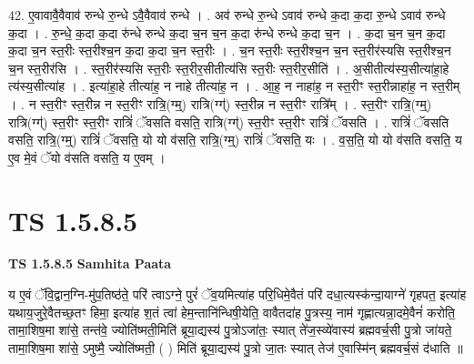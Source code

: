 \documentclass[17pt]{extarticle}
\begin{document}
42. ए॒वावावै॒वैवाव॑ रुन्धे रु॒न्धे ऽवै॒वैवाव॑ रुन्धे । . अव॑ रुन्धे रु॒न्धे ऽवाव॑ रुन्धे क॒दा क॒दा रु॒न्धे ऽवाव॑ रुन्धे क॒दा । . रु॒न्धे॒ क॒दा क॒दा रु॑न्धे रुन्धे क॒दा च॒न च॒न क॒दा रु॑न्धे रुन्धे क॒दा च॒न । . क॒दा च॒न च॒न क॒दा क॒दा च॒न स्त॒रीः स्त॒रीश्च॒न क॒दा क॒दा च॒न स्त॒रीः । . च॒न स्त॒रीः स्त॒रीश्च॒न च॒न स्त॒रीर॑स्यसि स्त॒रीश्च॒न च॒न स्त॒रीर॑सि । . स्त॒रीर॑स्यसि स्त॒रीः स्त॒रीर॒सीतीत्य॑सि स्त॒रीः स्त॒रीर॒सीति॑ । . अ॒सीतीत्य॑स्य॒सीत्या॑हा॒हे त्य॑स्य॒सीत्या॑ह । . इत्या॑हा॒हे तीत्या॑ह॒ न नाहे तीत्या॑ह॒ न । . आ॒ह॒ न नाहा॑ह॒ न स्त॒रीꣳ स्त॒रीन्नाहा॑ह॒ न स्त॒रीम् । . न स्त॒रीꣳ स्त॒रीन्न न स्त॒रीꣳ रात्रि॒(ग्म्॒) रात्रि(ग्ग्॑) स्त॒रीन्न न स्त॒रीꣳ रात्रि᳚म् । . स्त॒रीꣳ रात्रि॒(ग्म्॒) रात्रि(ग्ग्॑) स्त॒रीꣳ स्त॒रीꣳ रात्रिं॑ ॅवसति वसति॒ रात्रि(ग्ग्॑) स्त॒रीꣳ स्त॒रीꣳ रात्रिं॑ ॅवसति । . रात्रिं॑ ॅवसति वसति॒ रात्रि॒(ग्म्॒) रात्रिं॑ ॅवसति॒ यो यो व॑सति॒ रात्रि॒(ग्म्॒) रात्रिं॑ ॅवसति॒ यः । . व॒स॒ति॒ यो यो व॑सति वसति॒ य ए॒व मे॒वं ॅयो व॑सति वसति॒ य ए॒वम् । \newline
\pagebreak
{}
\section*{ TS 1.5.8.5 }

\textbf{TS 1.5.8.5 } \newline
\textbf{Samhita Paata} \newline

य ए॒वं ॅवि॒द्वान॒ग्नि-मु॑प॒तिष्ठ॑ते॒ परि॑ त्वाऽग्ने॒ पुरं॑ ॅव॒यमित्या॑ह परि॒धिमे॒वैतं परि॑ दधा॒त्यस्क॑न्दा॒याग्ने॑ गृहपत॒ इत्या॑ह यथाय॒जुरे॒वैतच्छ॒तꣳ हिमा॒ इत्या॑ह श॒तं त्वा॑ हेम॒न्तानि॑न्धिषी॒येति॒ वावैतदा॑ह पु॒त्रस्य॒ नाम॑ गृह्णात्यन्ना॒दमे॒वैनं॑ करोति॒ तामा॒शिष॒मा शा॑से॒ तन्त॑वे॒ ज्योति॑ष्मती॒मिति॑ ब्रूया॒द्यस्य॑ पु॒त्रोऽजा॑तः॒ स्यात् ते॑ज॒स्व्ये॑वास्य॑ ब्रह्मवर्च॒सी पु॒त्रो जा॑यते॒ तामा॒शिष॒मा शा॑से॒ ऽमुष्मै॒ ज्योति॑ष्मती॒ ( ) मिति॑ ब्रूया॒द्यस्य॑ पु॒त्रो जा॒तः स्यात् तेज॑ ए॒वास्मि॑न् ब्रह्मवर्च॒सं द॑धाति ॥ \newline
\end{document}
